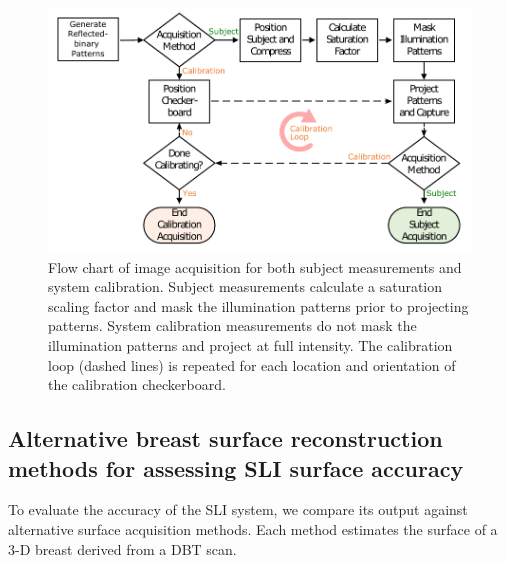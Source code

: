 \begin{figure}
    \begin{center}
    \includegraphics[width=.9\textwidth]{fig/omci/sli_flowchart.pdf}
    \end{center}
    \caption{Flow chart of image acquisition for both subject measurements and system calibration. Subject measurements calculate a saturation scaling factor and mask the illumination patterns prior to projecting patterns. System calibration measurements do not mask the illumination patterns and project at full intensity. The calibration loop (dashed lines) is repeated for each location and orientation of the calibration checkerboard.} 
    \label{fig:sli_flowchart}
\end{figure} 

\subsection{Alternative breast surface reconstruction methods for assessing SLI surface accuracy}
To evaluate the accuracy of the \ac{SLI} system, we compare its output against alternative surface acquisition methods. Each method estimates the surface of a 3-D breast derived from a \ac{DBT} scan.


